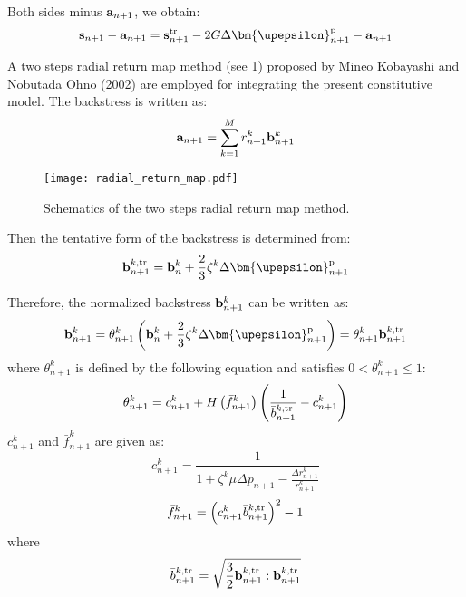Both sides minus ${{\bf{a}}_{n + 1}}$, we obtain:
\begin{equation}
\label{Equ:sminusa1}
{{\bf{s}}_{n + 1}} - {{\bf{a}}_{n + 1}} = {\bf{s}}_{n + 1}^{\rm{tr}} - 2G\Delta {\bm{\upepsilon }}_{n + 1}^{\rm{p}} - {{\bf{a}}_{n + 1}}
\end{equation}

A two steps radial return map method (see \ref{Fig:radial_return_map}) proposed by Mineo Kobayashi and Nobutada Ohno (2002) \cite{kobayashi2002implementation} are employed for integrating the present constitutive model. The backstress is written as:
\begin{equation}
{{\bf{a}}_{n + 1}} = \sum\limits_{k = 1}^M {r_{n + 1}^k{\bf{b}}_{n + 1}^k}
\end{equation}
\begin{figure}[!htp]
	\centering
	\texttt{[image: radial\_return\_map.pdf]}
	\caption{Schematics of the two steps radial return map method.}
	\label{Fig:radial_return_map}
\end{figure}

Then the tentative form of the backstress is determined from:
\begin{equation}
\label{Equ:btrn+1}
{\bf{b}}_{n + 1}^{k,{\rm{tr}}} = {\bf{b}}_n^k + \frac{2}{3}{\zeta ^k}\Delta {\bm{\upepsilon }}_{n + 1}^{\rm{p}}
\end{equation}

Therefore, the normalized backstress ${\bf{b}}_{n + 1}^k$ can be written as:
\begin{equation}
\label{Equ:bn+1}
{\bf{b}}_{n + 1}^k = \theta _{n + 1}^k\left( {{\bf{b}}_n^k + \frac{2}{3}{\zeta ^k}\Delta {\bm{\upepsilon }}_{n + 1}^{\rm{p}}} \right) = \theta _{n + 1}^k{\bf{b}}_{n + 1}^{k,{\rm{tr}}}
\end{equation}
where $\theta _{n + 1}^k$ is defined by the following equation and satisfies $0 < \theta _{n + 1}^k \leqslant 1$:
\begin{equation}
\label{Equ:thetan+1}
\theta _{n + 1}^k = c_{n + 1}^k + H\left( {\bar f_{n + 1}^k} \right)\left( {\frac{1}{{\bar b_{n + 1}^{k,{\rm{tr}}}}} - c_{n + 1}^k} \right)
\end{equation}
$c_{n + 1}^k$ and ${\bar f_{n + 1}^k}$ are given as:
\begin{equation}
c_{n + 1}^k = \frac{1}{{1 + {\zeta ^k}\mu \Delta {p_{n + 1}} - \frac{{\Delta r_{n + 1}^k}}{{r_{n + 1}^k}}}}
\end{equation}
\begin{equation}
\bar f_{n + 1}^k = {\left( {c_{n + 1}^k\bar b_{n + 1}^{k,{\rm{tr}}}} \right)^2} - 1
\end{equation}
where
\begin{equation}
\bar b_{n + 1}^{k,{\rm{tr}}} = \sqrt {\frac{3}{2}{\bf{b}}_{n + 1}^{k,{\rm{tr}}}:{\bf{b}}_{n + 1}^{k,{\rm{tr}}}}
\end{equation}

